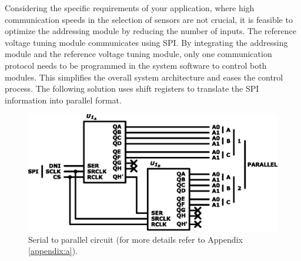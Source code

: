 Considering the specific requirements of your application, where high communication speeds in the selection of sensors are not crucial, it is feasible to optimize the addressing module by reducing the number of inputs. The reference voltage tuning module communicates using \ac{SPI}. By integrating the addressing module and the reference voltage tuning module, only one communication protocol needs to be programmed in the system software to control both modules. This simplifies the overall system architecture and eases the control process. The following solution uses shift registers to translate the \ac{SPI} information into parallel format.

\begin{figure}[!ht]
    \centering
    \includegraphics[width=.75\textwidth]{images/chapter_4/sensor_addressing/s2p.eps}
    \caption{Serial to parallel circuit (for more details refer to Appendix \ref{appendix:a}).}
    \label{figure:s2p}
\end{figure}

